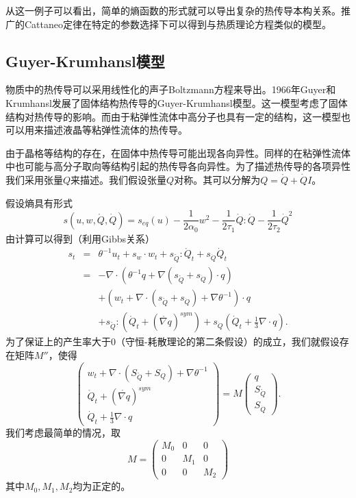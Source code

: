 \documentclass{article}
\begin{document}
从这一例子可以看出，简单的熵函数的形式就可以导出复杂的热传导本构关系。推广的Cattaneo定律在特定的参数选择下可以得到与热质理论方程类似的模型。

\subsection{Guyer-Krumhansl模型}
物质中的热传导可以采用线性化的声子Boltzmann方程来导出。1966年Guyer和Krumhansl发展了固体结构热传导的Guyer-Krumhansl模型\cite{guyer1966solution}。这一模型考虑了固体结构对热传导的影响。而由于粘弹性流体中高分子也具有一定的结构，这一模型也可以用来描述液晶等粘弹性流体的热传导\cite{}。

由于晶格等结构的存在，在固体中热传导可能出现各向异性。同样的在粘弹性流体中也可能与高分子取向等结构引起的热传导各向异性。为了描述热传导的各项异性我们采用张量$Q$来描述。我们假设张量${Q}$对称。其可以分解为${Q}=\mathring{{Q}}+\dot{Q}{I}$。

假设熵具有形式
\begin{equation*}
s(u,{w},\mathring{{Q}},\dot{Q})=s_{eq}(u)-\frac{1}{2 \alpha_0}{w}^2-\frac{1}{2\tau_1} {\mathring{{Q}}}:{\mathring{{Q}}}-\frac{1}{2\tau_2}\dot{Q}^2
\end{equation*}
由计算可以得到（利用Gibbs关系）
\begin{eqnarray*}
s_t &=& \theta^{-1} u_t +s_{w} \cdot {w}_t + s_{\mathring{{Q}}}:\mathring{{Q}}_t+s_{\dot{Q}} \dot{Q}_t \\
    &=& -\nabla \cdot (\theta^{-1} {q}+\nabla (s_{\mathring{{Q}}}+s_{\dot{Q}}) \cdot {q})\\
    	&&+({w}_t+\nabla \cdot (s_{\mathring{{Q}}}+s_{\dot{Q}})+\nabla \theta^{-1}) \cdot {q} \\
&& +s_{\mathring{{Q}}}:(\mathring{{Q}}_t+(\mathring{\nabla {q}})^{sym})+s_{\dot{Q}}(\dot{Q}_t+\frac{1}{3}\nabla \cdot {q}).
\end{eqnarray*}
为了保证上的产生率大于0（守恒-耗散理论的第二条假设）的成立，我们就假设存在矩阵$M''$，使得
\begin{equation*}
\left( \begin{array}{ll} {w}_t+\nabla \cdot (S_{\mathring{{Q}}}+S_Q)+\nabla \theta^{-1} \\ \mathring{{Q}}_t+(\mathring{\nabla {q}})^{sym} \\ \dot{Q}_t+\frac{1}{3} \nabla \cdot {q} \end{array} \right) = M \left( \begin{array}{l} {q} \\ S_{\mathring{{Q}}} \\S_{\dot{Q}} \end{array} \right).
\end{equation*}
我们考虑最简单的情况，取
\begin{equation*}
	M=\left( \begin{array}{lll} M_0 & 0 & 0 \\0 & M_1 & 0 \\0 & 0 & M_2 \end{array} \right)
\end{equation*}
其中$M_0,M_1,M_2$均为正定的。
\end{document}
